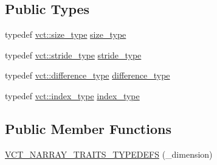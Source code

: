 \subsection*{Public Types}
\begin{DoxyCompactItemize}
\item 
typedef \hyperlink{namespacevct_a3e2935e13aac4500965e00d30565775b}{vct\+::size\+\_\+type} \hyperlink{classvct_dynamic_n_array_loop_engines_ab1f5ac52c9289b164e4ca3d37c9c857c}{size\+\_\+type}
\item 
typedef \hyperlink{namespacevct_ababd20afe3b060aa77ea229b0226c154}{vct\+::stride\+\_\+type} \hyperlink{classvct_dynamic_n_array_loop_engines_ae9b281249bae381156d7a354a06e7650}{stride\+\_\+type}
\item 
typedef \hyperlink{namespacevct_a1c68f426f63d011adc3563911c76550c}{vct\+::difference\+\_\+type} \hyperlink{classvct_dynamic_n_array_loop_engines_ae8d37731d603321cd52e0a6a6d13a017}{difference\+\_\+type}
\item 
typedef \hyperlink{namespacevct_a50405d87494dce1f22ee3930ca285ee9}{vct\+::index\+\_\+type} \hyperlink{classvct_dynamic_n_array_loop_engines_a072f02e39fa5ce2bfeb95aa4164ce813}{index\+\_\+type}
\end{DoxyCompactItemize}
\subsection*{Public Member Functions}
\begin{DoxyCompactItemize}
\item 
\hyperlink{classvct_dynamic_n_array_loop_engines_a6e465303126381f697946709c35d7c2c}{V\+C\+T\+\_\+\+N\+A\+R\+R\+A\+Y\+\_\+\+T\+R\+A\+I\+T\+S\+\_\+\+T\+Y\+P\+E\+D\+E\+F\+S} (\+\_\+dimension)
\end{DoxyCompactItemize}
